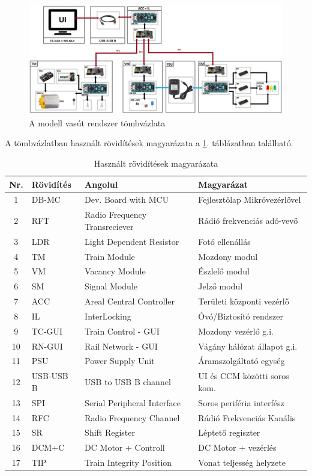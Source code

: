 \documentclass[a4paper,12pt]{article}
\begin{document}
\begin{figure}[htp]
	\centering
	\includegraphics[width=\linewidth]{images/block_diagram_sysra.png}
	\caption[Rendszer tömbvázlat]{A modell vasút rendszer tömbvázlata }
	\label{fig:block_diagram_sysra}
\end{figure}

A tömbvázlatban használt rövidítések magyarázata a \ref{tab:specabrv}. táblázatban található.
\begin{table}[htp]
    \centering
    \begin{tabular}{|c|l|l|l|} \hline
        Nr. & Rövidítés & Angolul & Magyarázat \\ \hline
		1 & DB-MC & Dev. Board with MCU & Fejlesztőlap Mikróvezérlővel \\ \hline
		2 & RFT & Radio Frequency Transreciever & Rádió frekvenciás adó-vevő \\ \hline
		3 & LDR & Light Dependent Resistor & Fotó ellenállás \\ \hline
		4 & TM & Train Module & Mozdony modul \\ \hline
		5 & VM & Vacancy Module & Észlelő modul \\ \hline
		6 & SM & Signal Module & Jelző modul \\ \hline
		7 & ACC & Areal Central Controller & Területi központi vezérlő \\ \hline
		8 & IL & InterLocking & Óvó/Biztosító rendszer \\ \hline
		9 & TC-GUI & Train Control - GUI & Mozdony vezérlő g.i. \\ \hline
		10 & RN-GUI & Rail Network - GUI & Vágány hálózat állapot g.i. \\ \hline
		11 & PSU & Power Supply Unit & Áramszolgáltató egység \\ \hline
		12 & USB-USB B & USB to USB B channel & UI és CCM közötti soros kom. \\ \hline
		13 & SPI & Serial Peripheral Interface & Soros periféria interfész \\ \hline
		14 & RFC & Radio Frequency Channel & Rádió Frekvenciás Kanális \\ \hline
		15 & SR & Shift Register & Léptető regiszter \\ \hline
		16 & DCM+C & DC Motor + Controll & DC Motor + vezérlés \\ \hline
		17 & TIP & Train Integrity Position & Vonat teljesség helyzete \\ \hline
	\end{tabular}
    \caption[Rövidítések]{Használt rövidítések magyarázata}
    \label{tab:specabrv}
\end{table}
\end{document}
